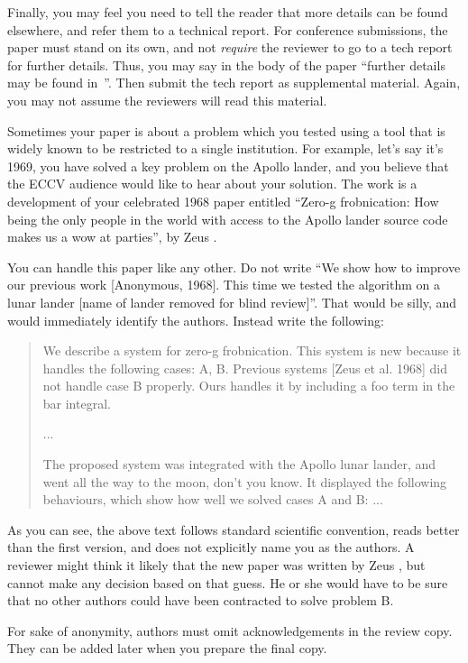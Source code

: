 \documentclass[runningheads]{llncs}
\begin{document}
Finally, you may feel you need to tell the reader that more details can be found elsewhere, and refer them to a technical report.
For conference submissions, the paper must stand on its own, and not \emph{require} the reviewer to go to a tech report for further details.
Thus, you may say in the body of the paper ``further details may be found in~\cite{Authors14b}''.
Then submit the tech report as supplemental material.
Again, you may not assume the reviewers will read this material.

Sometimes your paper is about a problem which you tested using a tool that is widely known to be restricted to a single institution.
For example, let's say it's 1969, you have solved a key problem on the Apollo lander, and you believe that the ECCV audience would like to hear about your
solution.
The work is a development of your celebrated 1968 paper entitled ``Zero-g frobnication: How being the only people in the world with access to the Apollo lander source code makes us a wow at parties'', by Zeus \etal.

You can handle this paper like any other.
Do not write ``We show how to improve our previous work [Anonymous, 1968].
This time we tested the algorithm on a lunar lander [name of lander removed for blind review]''.
That would be silly, and would immediately identify the authors.
Instead write the following:
\begin{quotation}
   We describe a system for zero-g frobnication.
   This system is new because it handles the following cases:
   A, B.  Previous systems [Zeus et al. 1968] did not  handle case B properly.
   Ours handles it by including a foo term in the bar integral.

   ...

   The proposed system was integrated with the Apollo lunar lander, and went all the way to the moon, don't you know.
   It displayed the following behaviours, which show how well we solved cases A and B: ...
\end{quotation}
As you can see, the above text follows standard scientific convention, reads better than the first version, and does not explicitly name you as the authors.
A reviewer might think it likely that the new paper was written by Zeus \etal, but cannot make any decision based on that guess.
He or she would have to be sure that no other authors could have been contracted to solve problem B.

For sake of anonymity, authors must omit acknowledgements in the review copy. 
They can be added later when you prepare the final copy.
\end{document}
